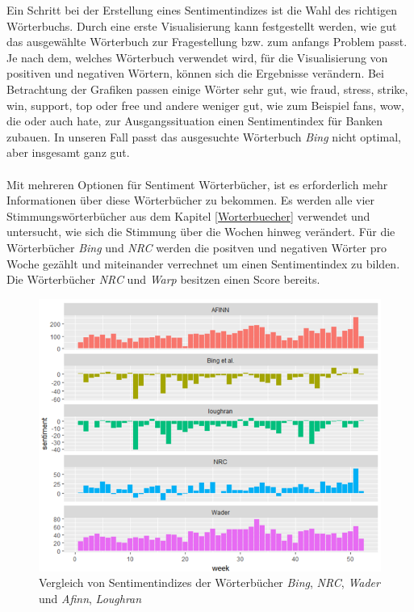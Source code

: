 Ein Schritt bei der Erstellung eines Sentimentindizes ist die Wahl des richtigen Wörterbuchs. Durch eine erste Visualisierung kann festgestellt werden, wie gut das ausgewählte Wörterbuch zur Fragestellung bzw. zum anfangs Problem passt. Je nach dem, welches Wörterbuch verwendet wird, für die Visualisierung von positiven und negativen Wörtern, können sich die Ergebnisse verändern. Bei Betrachtung der Grafiken passen einige Wörter sehr gut, wie fraud, stress, strike, win, support, top oder free und andere weniger gut, wie zum Beispiel fans, wow, die oder auch hate, zur Ausgangssituation einen Sentimentindex für Banken zubauen. In unseren Fall passt das ausgesuchte Wörterbuch \textit{Bing} nicht optimal, aber insgesamt ganz gut.
\\
\\
Mit mehreren Optionen für Sentiment Wörterbücher, ist es erforderlich mehr Informationen über diese Wörterbücher zu bekommen. Es werden alle vier Stimmungswörterbücher aus dem Kapitel \ref{Worterbuecher} verwendet und untersucht, wie sich die Stimmung über die Wochen hinweg verändert. Für die Wörterbücher \textit{Bing} und \textit{NRC} werden die positven und negativen Wörter pro Woche gezählt und miteinander verrechnet um einen Sentimentindex zu bilden. Die Wörterbücher \textit{NRC} und \textit{Warp} besitzen einen Score bereits.
\begin{figure}[H]
	\centering
	\includegraphics[width=1\textwidth]{Pictures/Woertbuch.png}
	\caption{Vergleich von Sentimentindizes der Wörterbücher \textit{Bing}, \textit{NRC}, \textit{Wader} und \textit{Afinn}, \textit{Loughran}}
	\label{senti}
\end{figure}
